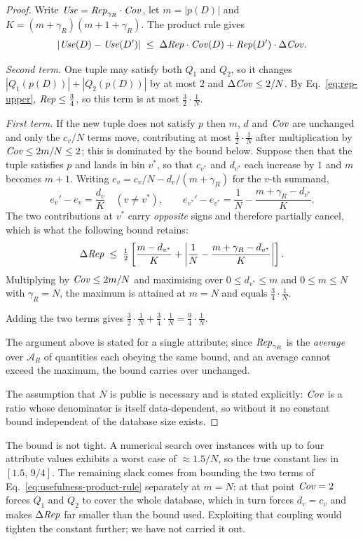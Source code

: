 \begin{proof}
Write $\mathit{Use}=\mathit{Rep}_{\gamma_R}\cdot\mathit{Cov}$, let $m=|p(D)|$ and $K=(m+\gamma_R)(m+1+\gamma_R)$.
The product rule gives
\begin{equation}
|\mathit{Use}(D)-\mathit{Use}(D')| \;\le\; \Delta\mathit{Rep}\cdot\mathit{Cov}(D) + \mathit{Rep}(D')\cdot\Delta\mathit{Cov} .
\label{eq:usefulness-product-rule}
\end{equation}

\emph{Second term.} One tuple may satisfy both $Q_1$ and $Q_2$, so it changes $|Q_1(p(D))|+|Q_2(p(D))|$ by at most $2$ and $\Delta\mathit{Cov}\le 2/N$.
By Eq.~\eqref{eq:rep-upper}, $\mathit{Rep}\le\tfrac34$, so this term is at most $\tfrac32\cdot\tfrac1N$.

\emph{First term.} If the new tuple does not satisfy $p$ then $m$, $d$ and $\mathit{Cov}$ are unchanged and only the $c_v/N$ terms move, contributing at most $\tfrac12\cdot\tfrac1N$ after multiplication by $\mathit{Cov}\le 2m/N\le2$; this is dominated by the bound below.
Suppose then that the tuple satisfies $p$ and lands in bin $v^*$, so that $c_{v^*}$ and $d_{v^*}$ each increase by $1$ and $m$ becomes $m+1$.
Writing $e_v=c_v/N-d_v/(m+\gamma_R)$ for the $v$-th summand,
\[
e_v'-e_v=\frac{d_v}{K}\quad(v\ne v^*),
\qquad
e_{v^*}'-e_{v^*}=\frac1N-\frac{m+\gamma_R-d_{v^*}}{K}.
\]
The two contributions at $v^*$ carry \emph{opposite} signs and therefore partially cancel, which is what the following bound retains:
\[
\Delta\mathit{Rep}\;\le\;\tfrac12\left[\frac{m-d_{v^*}}{K}+\left|\frac1N-\frac{m+\gamma_R-d_{v^*}}{K}\right|\right].
\]
Multiplying by $\mathit{Cov}\le 2m/N$ and maximising over $0\le d_{v^*}\le m$ and $0\le m\le N$ with $\gamma_R=N$, the maximum is attained at $m=N$ and equals $\tfrac34\cdot\tfrac1N$.

Adding the two terms gives $\tfrac32\cdot\tfrac1N+\tfrac34\cdot\tfrac1N=\tfrac94\cdot\tfrac1N$.

The argument above is stated for a single attribute; since $\mathit{Rep}_{\gamma_R}$ is the \emph{average} over $\mathcal{A}_R$ of quantities each obeying the same bound, and an average cannot exceed the maximum, the bound carries over unchanged.

The assumption that $N$ is public is necessary and is stated explicitly: $\mathit{Cov}$ is a ratio whose denominator is itself data-dependent, so without it no constant bound independent of the database size exists.
\end{proof}

\begin{remark}[Tightness]
\label{rem:usefulness-tightness}
The bound is not tight.
A numerical search over instances with up to four attribute values exhibits a worst case of $\approx 1.5/N$, so the true constant lies in $[1.5,\,9/4]$.
The remaining slack comes from bounding the two terms of Eq.~\eqref{eq:usefulness-product-rule} separately at $m=N$: at that point $\mathit{Cov}=2$ forces $Q_1$ and $Q_2$ to cover the whole database, which in turn forces $d_v=c_v$ and makes $\Delta\mathit{Rep}$ far smaller than the bound used.
Exploiting that coupling would tighten the constant further; we have not carried it out.
\end{remark}

